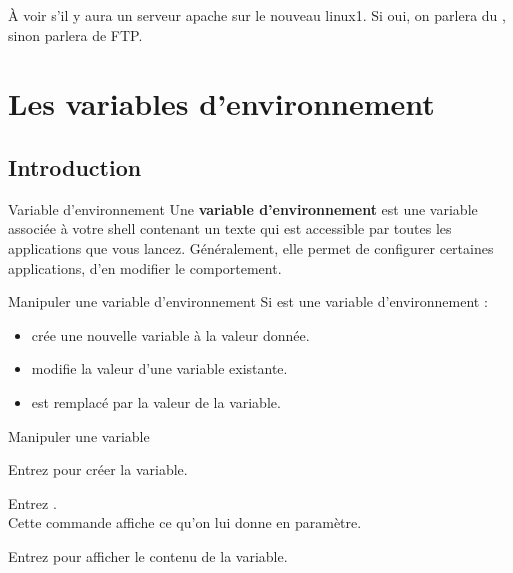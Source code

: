 \documentclass[a4paper,11pt]{style-esi/td}
\begin{document}
			\begin{todo}
				À voir s'il y aura un serveur apache sur le nouveau linux1.
				Si oui, on parlera du , 
				sinon parlera de FTP. 
			\end{todo}
\newpage
\section{Les variables d'environnement}  

	\subsection{Introduction}

		\begin{theorie}{Variable d'environnement}
			Une \textbf{variable d'environnement} 
			est une variable associée à votre shell 
			contenant un texte qui est accessible 
			par toutes les applications que vous lancez. 
			Généralement, elle permet de configurer certaines applications, 
			d'en modifier le comportement.
		\end{theorie}	

		\begin{theorie}{Manipuler une variable d'environnement}
			Si  est une variable d'environnement :
			\begin{itemize}
			\item {} crée une nouvelle variable à la valeur donnée.
			\item {} modifie la valeur d'une variable existante.
			\item {} est remplacé par la valeur de la variable.
			\end{itemize}
		\end{theorie}

		\begin{Experience}{Manipuler une variable}
			\begin{steps}
			\item Entrez  pour créer la variable.
			\item Entrez .
				\\Cette commande affiche ce qu'on lui donne en paramètre.
			\item Entrez  pour afficher le contenu de la variable.
			\end{steps}
		\end{Experience}
\end{document}

